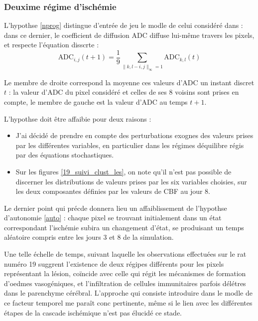 \subsubsection{Deuxime r\'egime d'isch\'emie}








L'hypothse \ref{nprog} distingue d'entr\'ee de jeu le modle de celui consid\'er\'e dans \cite{Duval_JCBFM_02} : %
dans ce dernier, le coefficient de diffusion ADC diffuse lui-m\^eme  travers les pixels, et respecte l'\'equation disscrte :
\[\text{ADC}_{i,j}(t+1)=\frac{1}{9}\sum\limits_{\|k,l-i,j\|_{\infty}=1}\text{ADC}_{k,l}(t)\]

Le membre de droite correspond  la moyenne ces valeurs d'ADC  un instant discret $t$ : %
la valeur d'ADC du pixel consid\'er\'e et celles de ses $8$ voisins sont prises en compte, %
le membre de gauche est la valeur d'ADC au temps $t+1$.

\par
L'hypothse \label{var_comp} doit \^etre affaibie pour deux raisons :
\begin{itemize}
\item J'ai d\'ecid\'e de prendre en compte des perturbations exognes des valeurs prises par les diff\'erentes variables, %
en particulier dans les r\'egimes d\'equilibre r\'egis par des \'equations stochastiques.
\item Sur les figures \ref{19_suivi_clust_les}, on note qu'il n'est pas possible de discerner les distributions de valeurs prises par les six variables choisies, %
sur les deux composantes d\'efinies par les valeurs de CBF au jour 8.
\end{itemize}

\par
Le dernier point qui pr\'ecde donnera lieu  un affaiblissement de l'hypothse d'autonomie \ref{auto} : %
chaque pixel se trouvant initialement dans un \'etat correspondant  l'isch\'emie subira un changement d'\'etat, %
se produisant  un temps al\'eatoire compris entre les jours 3 et 8 de la simulation.

\par
Une telle \'echelle de temps, suivant laquelle les observations effectu\'ees sur le rat num\'ero 19 %
suggrent l'existence de deux r\'egipes diff\'erents pour les pixels repr\'esentant la l\'esion, %
co\"incide avec celle qui r\'egit les m\'ecanismes de formation d'oedmes vasog\'eniques, %
et l'infiltration de cellules immunitaires parfois d\'el\'etres dans le parenchyme c\'er\'ebral. %
L'approche qui consiste  introduire dans le modle de ce facteur temporel me para\^it conc pertinente, %
m\^eme si le lien avec les diff\'erentes \'etapes de la cascade isch\'emique n'est pas \'elucid\'e  ce stade.

